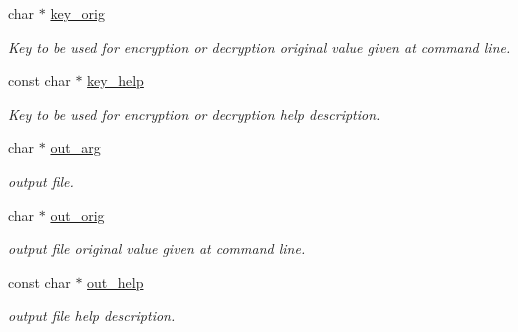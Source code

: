 \begin{DoxyCompactItemize}
char $\ast$ \hyperlink{structgengetopt__args__info_a46fe55fd04263db7ebf4d5afa09f696f}{key\+\_\+orig}
\begin{DoxyCompactList}\small\item\em Key to be used for encryption or decryption original value given at command line. \end{DoxyCompactList}\item 
\mbox{\label{structgengetopt__args__info_a9f98c455fbbd65117dbbd1e17723c92e}} 
const char $\ast$ \hyperlink{structgengetopt__args__info_a9f98c455fbbd65117dbbd1e17723c92e}{key\+\_\+help}
\begin{DoxyCompactList}\small\item\em Key to be used for encryption or decryption help description. \end{DoxyCompactList}\item 
\mbox{\label{structgengetopt__args__info_a1022ab6bd8cfa9596789a6a7059be6af}} 
char $\ast$ \hyperlink{structgengetopt__args__info_a1022ab6bd8cfa9596789a6a7059be6af}{out\+\_\+arg}
\begin{DoxyCompactList}\small\item\em output file. \end{DoxyCompactList}\item 
\mbox{\label{structgengetopt__args__info_a342bcb7cbcac1cbaefd3ffaafa3736ff}} 
char $\ast$ \hyperlink{structgengetopt__args__info_a342bcb7cbcac1cbaefd3ffaafa3736ff}{out\+\_\+orig}
\begin{DoxyCompactList}\small\item\em output file original value given at command line. \end{DoxyCompactList}\item 
\mbox{\label{structgengetopt__args__info_ad1e0068ecb61c96fc1b239c575d125d9}} 
const char $\ast$ \hyperlink{structgengetopt__args__info_ad1e0068ecb61c96fc1b239c575d125d9}{out\+\_\+help}
\begin{DoxyCompactList}\small\item\em output file help description. \end{DoxyCompactList}\item 
\mbox{\label{structgengetopt__args__info_a31a0c7c5b907732c8f4f74717bfdb8bc}} 

\end{DoxyCompactItemize}
